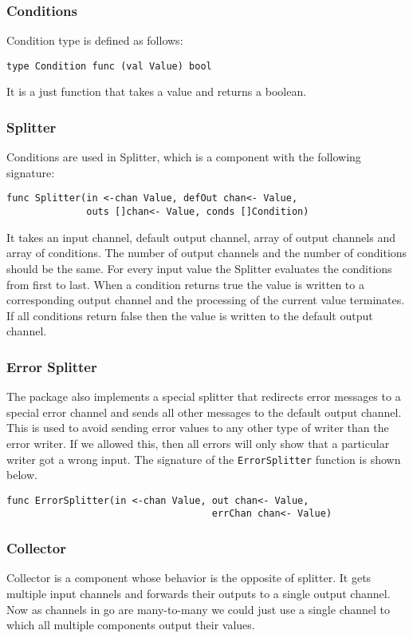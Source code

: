 \subsubsection{Conditions}
Condition type is defined as follows:
\begin{lstlisting}
type Condition func (val Value) bool
\end{lstlisting}
It is a just function that takes a value and returns a boolean.

\subsubsection{Splitter}
Conditions are used in Splitter, which is a component with the 
following signature:
\begin{lstlisting}
func Splitter(in <-chan Value, defOut chan<- Value, 
			  outs []chan<- Value, conds []Condition)
\end{lstlisting}
It takes an input channel, default output channel, array of output channels and array of conditions.
The number of output channels and the number of conditions should be the same.
For every input value the Splitter evaluates the conditions from first to last.
When a condition returns true the value is written to a corresponding output channel 
and the processing of the current value terminates. If all conditions return false
then the value is written to the default output channel.

\subsubsection{Error Splitter}
The package also implements a special splitter that redirects error messages
to a special error channel and sends all other messages to the default output 
channel. This is used to avoid sending error values to 
any other type of writer than the error writer. If we allowed this, then
all errors will only show that a particular writer got a wrong input.
The signature of the \texttt{ErrorSplitter} function is shown below.
\begin{lstlisting}
func ErrorSplitter(in <-chan Value, out chan<- Value, 
                                    errChan chan<- Value)
\end{lstlisting}

\subsubsection{Collector}
Collector is a component whose behavior is the opposite of splitter. 
It gets multiple input channels
and forwards their outputs to a single output channel. Now as channels
in go are many-to-many we could just use a single channel to which all
multiple components output their values. 

